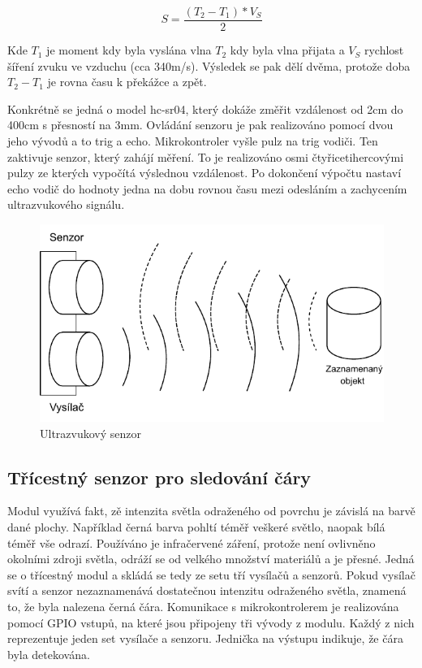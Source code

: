 $$S = \frac{(T_2 - T_1) * V_S}{2}$$

Kde $T_1$ je moment kdy byla vyslána vlna $T_2$ kdy byla vlna přijata a $V_S$ rychlost šíření zvuku ve vzduchu (cca 340m/s). Výsledek se pak dělí dvěma, protože doba $T_2 - T_1$ je rovna času k překážce a zpět.

Konkrétně se jedná o model hc-sr04, který dokáže změřit vzdálenost od 2cm do 400cm s přesností na 3mm. Ovládání senzoru je pak realizováno pomocí dvou jeho vývodů a to trig a echo. Mikrokontroler vyšle pulz na trig vodiči. Ten zaktivuje senzor, který zahájí měření. To je realizováno osmi čtyřicetihercovými pulzy ze kterých vypočítá výslednou vzdálenost. Po dokončení výpočtu nastaví echo vodič do hodnoty jedna na dobu rovnou času mezi odesláním a zachycením ultrazvukového signálu. \cite{embeded_robotics}

\begin{figure}[h!]
	\centering
	\includegraphics[scale=0.75]{obrazky-figures/ultrasonic.pdf}
	\caption{Ultrazvukový senzor}
	\label{}
\end{figure}

\subsection*{Třícestný senzor pro sledování čáry}
Modul využívá fakt, zě intenzita světla odraženého od povrchu je závislá na barvě dané plochy. Například černá barva pohltí téměř veškeré světlo, naopak bílá téměř vše odrazí. Používáno je infračervené záření, protože není ovlivněno okolními zdroji světla, odráží se od velkého množství materiálů a je přesné. Jedná se o třícestný modul a skládá se tedy ze setu tří vysílačů a senzorů. Pokud vysílač svítí a senzor nezaznamenává dostatečnou intenzitu odraženého světla, znamená to, že byla nalezena černá čára. \cite{embeded_robotics}
Komunikace s mikrokontrolerem je realizována pomocí GPIO vstupů, na které jsou připojeny tři vývody z modulu. Každý z nich reprezentuje jeden set vysílače a senzoru. Jednička na výstupu indikuje, že čára byla detekována.

